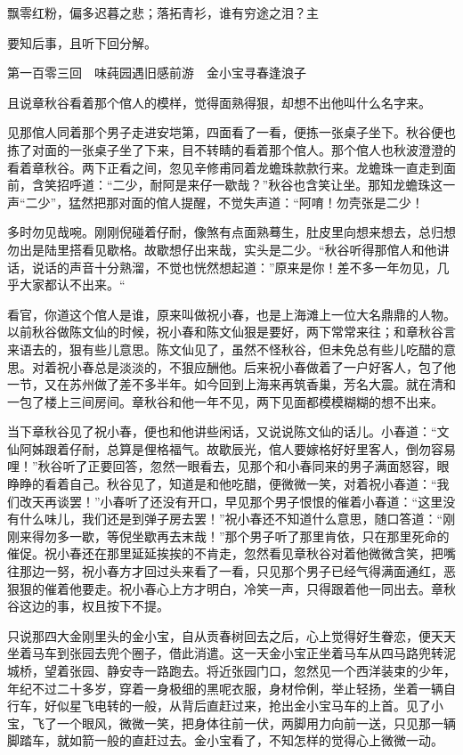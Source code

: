 \documentclass[12pt,UTF8]{ctexbook}
\begin{document}
{{{飘零红粉，偏多迟暮之悲；落拓青衫，谁有穷途之泪？主

要知后事，且听下回分解。





第一百零三回　味莼园遇旧感前游　金小宝寻春逢浪子





且说章秋谷看着那个倌人的模样，觉得面熟得狠，却想不出他叫什么名字来。

见那倌人同着那个男子走进安垲第，四面看了一看，便拣一张桌子坐下。秋谷便也拣了对面的一张桌子坐了下来，目不转睛的看着那个倌人。那个倌人也秋波澄澄的看着章秋谷。两下正看之间，忽见辛修甫同着龙蟾珠款款行来。龙蟾珠一直走到面前，含笑招呼道：“二少，耐阿是来仔一歇哉？”秋谷也含笑让坐。那知龙蟾珠这一声“二少”，猛然把那对面的倌人提醒，不觉失声道：“阿唷！勿壳张是二少！

多时勿见哉啘。刚刚倪碰着仔耐，像煞有点面熟蓦生，肚皮里向想来想去，总归想勿出是陆里搭看见歇格。故歇想仔出来哉，实头是二少。“秋谷听得那倌人和他讲话，说话的声音十分熟溜，不觉也恍然想起道：”原来是你！差不多一年勿见，几乎大家都认不出来。“

看官，你道这个倌人是谁，原来叫做祝小春，也是上海滩上一位大名鼎鼎的人物。以前秋谷做陈文仙的时候，祝小春和陈文仙狠是要好，两下常常来往；和章秋谷言来语去的，狠有些儿意思。陈文仙见了，虽然不怪秋谷，但未免总有些儿吃醋的意思。对着祝小春总是淡淡的，不狠应酬他。后来祝小春做着了一户好客人，包了他一节，又在苏州做了差不多半年。如今回到上海来再筑香巢，芳名大震。就在清和一包了楼上三间房间。章秋谷和他一年不见，两下见面都模模糊糊的想不出来。

当下章秋谷见了祝小春，便也和他讲些闲话，又说说陈文仙的话儿。小春道：“文仙阿姊跟着仔耐，总算是俚格福气。故歇辰光，倌人要嫁格好好里客人，倒勿容易哩！”秋谷听了正要回答，忽然一眼看去，见那个和小春同来的男子满面怒容，眼睁睁的看着自己。秋谷见了，知道是和他吃醋，便微微一笑，对着祝小春道：“我们改天再谈罢！”小春听了还没有开口，早见那个男子恨恨的催着小春道：“这里没有什么味儿，我们还是到弹子房去罢！”祝小春还不知道什么意思，随口答道：“刚刚来得勿多一歇，等倪坐歇再去末哉！”那个男子听了那里肯依，只在那里死命的催促。祝小春还在那里延延挨挨的不肯走，忽然看见章秋谷对着他微微含笑，把嘴往那边一努，祝小春方才回过头来看了一看，只见那个男子已经气得满面通红，恶狠狠的催着他要走。祝小春心上方才明白，冷笑一声，只得跟着他一同出去。章秋谷这边的事，权且按下不提。

只说那四大金刚里头的金小宝，自从贡春树回去之后，心上觉得好生眷恋，便天天坐着马车到张园去兜个圈子，借此消遣。这一天金小宝正坐着马车从四马路兜转泥城桥，望着张园、静安寺一路跑去。将近张园门口，忽然见一个西洋装束的少年，年纪不过二十多岁，穿着一身极细的黑呢衣服，身材伶俐，举止轻扬，坐着一辆自行车，好似星飞电转的一般，从背后直赶过来，抢出金小宝马车的上首。见了小宝，飞了一个眼风，微微一笑，把身体往前一伏，两脚用力向前一送，只见那一辆脚踏车，就如箭一般的直赶过去。金小宝看了，不知怎样的觉得心上微微一动。

}}}
\end{document}
